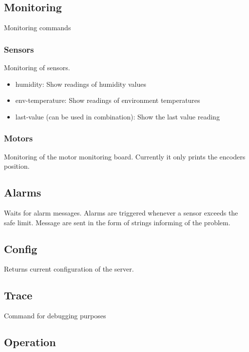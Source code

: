 \documentclass[letterpaper, 10 pt]{article}
\begin{document}
\subsection{Monitoring}
Monitoring commands
\subsubsection{Sensors}
Monitoring of sensors. 
\begin{itemize}
	\item humidity: Show readings of humidity values 
	\item env-temperature: Show readings of environment temperatures
	\item last-value (can be used in combination): Show the last value reading
\end{itemize}
\subsubsection{Motors}
Monitoring of the motor monitoring board. Currently it only prints the encoders position.

\subsection{Alarms}
Waits for alarm messages. Alarms are triggered whenever a sensor exceeds the safe limit. Message are sent in the form of strings informing of the problem.

\subsection{Config}
Returns current configuration of the server.

\subsection{Trace}
Command for debugging purposes

\subsection{Operation} \label{operationcmds}
\end{document}
